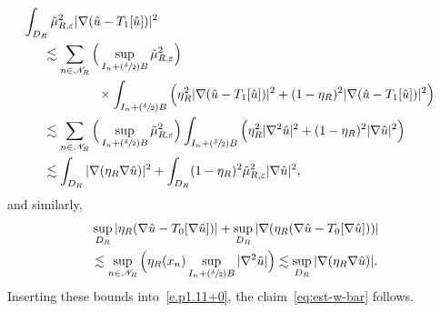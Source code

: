 \documentclass[10pt]{amsart}
\let\mathcal\mathscr
\newcommand{\Psfrac}[2]{(\sfrac{#1}{#2})}
\theoremstyle{plain}
\theoremstyle{definition}
\newcommand{\e}{\varepsilon}
\newcommand{\Nc}{\mathcal N}
\begin{document}
\begin{equation}
\label{eq:bnd-uhatT1}
\begin{aligned}
\lefteqn{\int_{D_R} \tilde \mu_{R,\e}^2|\nabla (\hat u-T_1[\hat u])|^2}\\
&\hspace*{5mm}\lesssim \sum_{n\in\Nc_R}\Big(\sup_{I_n+\Psfrac\delta2 B}\tilde\mu_{R,\e}^2\Big)\\
&\hspace*{2cm}\times\int_{I_n+\Psfrac\delta2 B}\Big( \eta_R^2 |\nabla (\hat u-T_1[\hat u])|^2+ (1-\eta_R)^2 |\nabla (\hat u-T_1[\hat u])|^2\Big)\\
&\hspace*{5mm}\lesssim \sum_{n\in\Nc_R}\Big(\sup_{I_n+\Psfrac\delta2 B}\tilde\mu_{R,\e}^2\Big)\int_{I_n+\Psfrac\delta2 B}\Big( \eta_R^2 |\nabla^2\hat u|^2+ (1-\eta_R)^2 |\nabla\hat u|^2\Big)\\
&\hspace*{5mm}\lesssim \int_{D_R} |\nabla(\eta_R\nabla \hat u)|^2+ \int_{D_R} (1-\eta_R)^2\tilde \mu_{R,\e}^2 |\nabla \hat u|^2,
\end{aligned}
\end{equation}
and similarly,
\begin{multline}\label{eq:bnd-ubarutil}
\sup_{D_R}|\eta_R(\nabla\hat u-T_0[\nabla\hat u])|+\sup_{D_R}|\nabla (\eta_R (\nabla\hat u-T_0[\nabla\hat u]))|\\
\lesssim \sup_{n\in\Nc_R}\Big(\eta_R(x_n)\sup_{I_n+\Psfrac\delta2 B}|\nabla^2\hat u|\Big)
\lesssim \sup_{D_R}|\nabla(\eta_R\nabla \hat u)|.
\end{multline}
Inserting these bounds into~\eqref{e.p1.11+0}, the claim~\eqref{eq:est-w-bar} follows.
\end{document}

